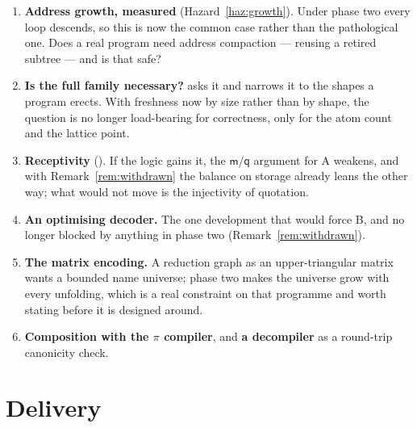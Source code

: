 \documentclass[11pt,a4paper]{article}
\newcommand{\mm}{\mathsf{m}}
\newcommand{\qq}{\mathsf{q}}
\theoremstyle{definition}
\theoremstyle{plain}
\begin{document}
\begin{enumerate}[leftmargin=1.8em]
\item \textbf{Address growth, measured} (Hazard~\ref{haz:growth}). Under phase
two every loop descends, so this is now the common case rather than the
pathological one. Does a real program need address compaction --- reusing a
retired subtree --- and is that safe?
\item \textbf{Is the full family necessary?} \cite[\S12]{draft3} asks it and
\cite[Rem.~6.15]{draft3} narrows it to the shapes a program erects. With
freshness now by size rather than by shape, the question is no longer
load-bearing for correctness, only for the atom count and the lattice point.
\item \textbf{Receptivity} (\cite[open item~5]{logic}). If the logic gains it,
the $\mm$/$\qq$ argument for A weakens, and with
Remark~\ref{rem:withdrawn} the balance on storage already leans the other way;
what would not move is the injectivity of quotation.
\item \textbf{An optimising decoder.} The one development that would force B,
and no longer blocked by anything in phase two (Remark~\ref{rem:withdrawn}).
\item \textbf{The matrix encoding.} A reduction graph as an upper-triangular
matrix wants a bounded name universe; phase two makes the universe grow with
every unfolding, which is a real constraint on that programme and worth
stating before it is designed around.
\item \textbf{Composition with the $\pi$ compiler}, and \textbf{a decompiler}
as a round-trip canonicity check.
\end{enumerate}

\section{Delivery}
\end{document}
